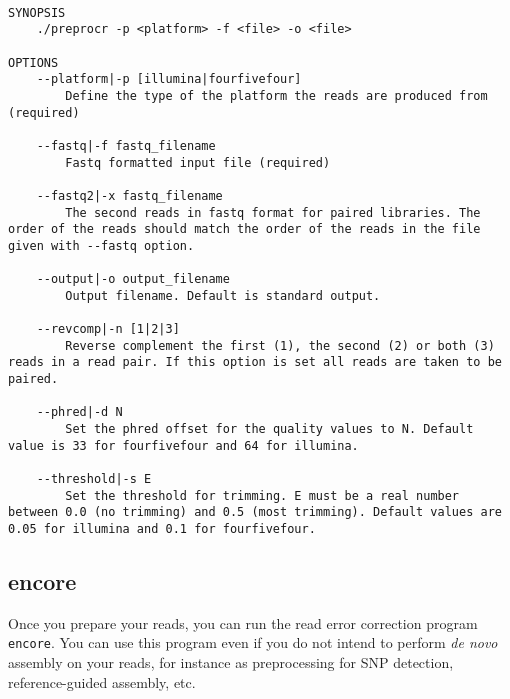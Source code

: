 \documentclass[12pt,a4paper]{report}
\begin{document}
\begin{lstlisting}

SYNOPSIS
    ./preprocr -p <platform> -f <file> -o <file> 

OPTIONS 
    --platform|-p [illumina|fourfivefour] 
        Define the type of the platform the reads are produced from (required) 

    --fastq|-f fastq_filename 
        Fastq formatted input file (required) 

    --fastq2|-x fastq_filename 
        The second reads in fastq format for paired libraries. The order of the reads should match the order of the reads in the file given with --fastq option. 

    --output|-o output_filename 
        Output filename. Default is standard output. 

    --revcomp|-n [1|2|3] 
        Reverse complement the first (1), the second (2) or both (3) reads in a read pair. If this option is set all reads are taken to be paired. 

    --phred|-d N 
        Set the phred offset for the quality values to N. Default value is 33 for fourfivefour and 64 for illumina. 

    --threshold|-s E 
        Set the threshold for trimming. E must be a real number between 0.0 (no trimming) and 0.5 (most trimming). Default values are 0.05 for illumina and 0.1 for fourfivefour. 

\end{lstlisting}

\subsection{encore}
\label{ercor}

Once you prepare your reads, you can run the read error correction program \texttt{encore}. You can use this program even if you do not intend to perform \emph{de novo} assembly on your reads, for instance as preprocessing for SNP detection, reference-guided assembly, etc.
\end{document}
